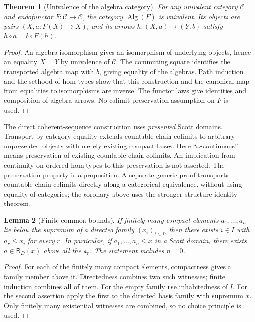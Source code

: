 \documentclass[11pt,a4paper]{article}
\newtheorem{theorem}{Theorem}[section]
\newtheorem{lemma}[theorem]{Lemma}
\theoremstyle{definition}
\theoremstyle{remark}
\newcommand{\B}{\mathsf B}
\begin{document}
\begin{theorem}[Univalence of the algebra category]
For any univalent category $\mathcal C$ and endofunctor
$F:\mathcal C\to\mathcal C$, the category $\operatorname{Alg}(F)$ is
univalent. Its objects are pairs $(X,a:F(X)\to X)$, and its arrows
$h:(X,a)\to(Y,b)$ satisfy $h\circ a=b\circ F(h)$.
\end{theorem}
\begin{proof}
An algebra isomorphism gives an isomorphism of underlying objects, hence
an equality $X=Y$ by univalence of $\mathcal C$. The commuting square
identifies the transported algebra map with $b$, giving equality of the
algebras. Path induction and the sethood of hom types show that this
construction and the canonical map from equalities to isomorphisms are
inverse. The functor laws give identities and composition of algebra
arrows. No colimit preservation assumption on $F$ is used.
\end{proof}

The direct coherent-sequence construction uses \emph{presented} Scott
domains. Transport by category equality extends countable-chain colimits
to arbitrary unpresented objects with merely existing compact bases.
Here ``$\omega$-continuous'' means
preservation of existing countable-chain colimits. An implication from
continuity on ordered hom types to this preservation is not asserted.
The preservation property is a proposition. A separate generic proof
transports countable-chain colimits directly along a categorical
equivalence, without using equality of categories; the corollary above
uses the stronger structure identity theorem.

\begin{lemma}[Finite common bounds]\label{lem:finite}
If finitely many compact elements $a_1,\ldots,a_n$ lie below the supremum
of a directed family $(x_i)_{i\in I}$, then there exists $i\in I$ with
$a_r\leq x_i$ for every $r$. In particular, if $a_1,\ldots,a_n\leq x$
in a Scott domain, there exists $a\in\B_D(x)$ above all the $a_r$.
The statement includes $n=0$.
\end{lemma}
\begin{proof}
For each of the finitely many compact elements, compactness gives a
family member above it. Directedness combines two such witnesses; finite
induction combines all of them. For the empty family use inhabitedness
of $I$. For the second assertion apply the first to the directed basis
family with supremum $x$. Only finitely many existential witnesses are
combined, so no choice principle is used.
\end{proof}
\end{document}
